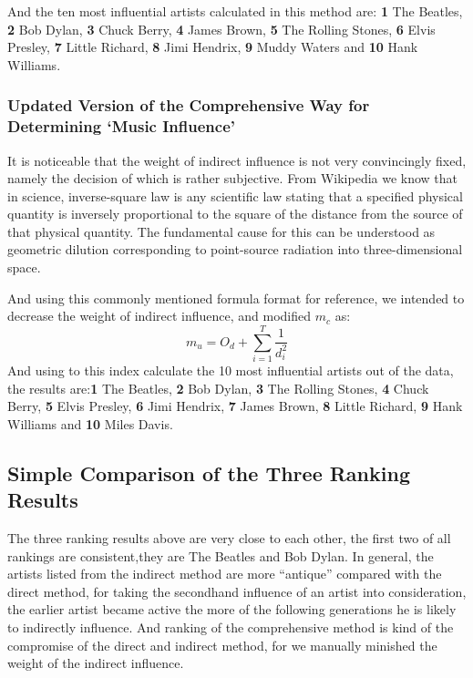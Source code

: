\documentclass[12pt]{article}
\begin{document}
And the ten most influential artists calculated in this method are: \textbf{1} The Beatles, \textbf{2} Bob Dylan, \textbf{3} Chuck Berry, \textbf{4} James Brown, \textbf{5} The Rolling Stones, \textbf{6} Elvis Presley, \textbf{7} Little Richard, \textbf{8} Jimi Hendrix, \textbf{9} Muddy Waters and \textbf{10} Hank Williams.



\subsubsection{Updated Version of the Comprehensive Way for Determining `Music Influence'}\quad \;
It is noticeable that the weight of indirect influence is not very convincingly fixed, namely the decision of which is rather subjective.
From Wikipedia we know that in science, inverse-square law is any scientific law stating that a specified physical quantity is inversely proportional to the square of the distance from the source of that physical quantity. The fundamental cause for this can be understood as geometric dilution corresponding to point-source radiation into three-dimensional space.


And using this commonly mentioned formula format for reference, we intended to decrease the weight of indirect influence, and modified ${m_c}$ as:
\[{m_u} = {O_d} + \sum\limits_{i = 1}^T {\frac{1}{{d_i^2}}} \]
And using to this index calculate the 10 most influential artists out of the data, the results are:\textbf{1} The Beatles, \textbf{2} Bob Dylan, \textbf{3} The Rolling Stones, \textbf{4} Chuck Berry, \textbf{5} Elvis Presley, \textbf{6} Jimi Hendrix, \textbf{7} James Brown, \textbf{8} Little Richard, \textbf{9} Hank Williams and \textbf{10} Miles Davis.
\subsection{Simple Comparison of the Three Ranking Results}\quad \;
The three ranking results above are very close to each other, the  first two of all rankings are consistent,they are The Beatles and Bob Dylan. In general, the artists listed from the indirect method are more ``antique'' compared with the direct method, for taking the secondhand influence of an artist into consideration, the earlier artist became active the more of the following generations he is likely to indirectly influence. And ranking of the comprehensive method is kind of the compromise of the direct and indirect method, for we manually minished the weight of the indirect influence.
\end{document}
